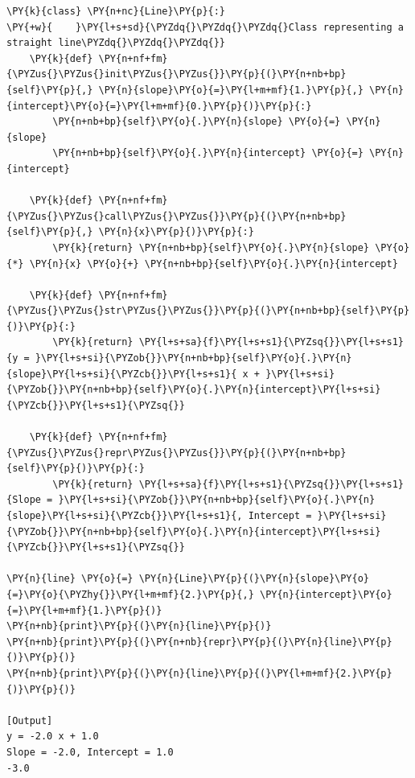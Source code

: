 \begin{Verbatim}[label=\makebox{\url{https://github.com/lucabaldini/cmepda/tree/master/slides/latex/snippets/callable\_line.py}},commandchars=\\\{\}]
\PY{k}{class} \PY{n+nc}{Line}\PY{p}{:}
\PY{+w}{    }\PY{l+s+sd}{\PYZdq{}\PYZdq{}\PYZdq{}Class representing a straight line\PYZdq{}\PYZdq{}\PYZdq{}}
    \PY{k}{def} \PY{n+nf+fm}{\PYZus{}\PYZus{}init\PYZus{}\PYZus{}}\PY{p}{(}\PY{n+nb+bp}{self}\PY{p}{,} \PY{n}{slope}\PY{o}{=}\PY{l+m+mf}{1.}\PY{p}{,} \PY{n}{intercept}\PY{o}{=}\PY{l+m+mf}{0.}\PY{p}{)}\PY{p}{:}
        \PY{n+nb+bp}{self}\PY{o}{.}\PY{n}{slope} \PY{o}{=} \PY{n}{slope}
        \PY{n+nb+bp}{self}\PY{o}{.}\PY{n}{intercept} \PY{o}{=} \PY{n}{intercept}

    \PY{k}{def} \PY{n+nf+fm}{\PYZus{}\PYZus{}call\PYZus{}\PYZus{}}\PY{p}{(}\PY{n+nb+bp}{self}\PY{p}{,} \PY{n}{x}\PY{p}{)}\PY{p}{:}
        \PY{k}{return} \PY{n+nb+bp}{self}\PY{o}{.}\PY{n}{slope} \PY{o}{*} \PY{n}{x} \PY{o}{+} \PY{n+nb+bp}{self}\PY{o}{.}\PY{n}{intercept}

    \PY{k}{def} \PY{n+nf+fm}{\PYZus{}\PYZus{}str\PYZus{}\PYZus{}}\PY{p}{(}\PY{n+nb+bp}{self}\PY{p}{)}\PY{p}{:}
        \PY{k}{return} \PY{l+s+sa}{f}\PY{l+s+s1}{\PYZsq{}}\PY{l+s+s1}{y = }\PY{l+s+si}{\PYZob{}}\PY{n+nb+bp}{self}\PY{o}{.}\PY{n}{slope}\PY{l+s+si}{\PYZcb{}}\PY{l+s+s1}{ x + }\PY{l+s+si}{\PYZob{}}\PY{n+nb+bp}{self}\PY{o}{.}\PY{n}{intercept}\PY{l+s+si}{\PYZcb{}}\PY{l+s+s1}{\PYZsq{}}

    \PY{k}{def} \PY{n+nf+fm}{\PYZus{}\PYZus{}repr\PYZus{}\PYZus{}}\PY{p}{(}\PY{n+nb+bp}{self}\PY{p}{)}\PY{p}{:}
        \PY{k}{return} \PY{l+s+sa}{f}\PY{l+s+s1}{\PYZsq{}}\PY{l+s+s1}{Slope = }\PY{l+s+si}{\PYZob{}}\PY{n+nb+bp}{self}\PY{o}{.}\PY{n}{slope}\PY{l+s+si}{\PYZcb{}}\PY{l+s+s1}{, Intercept = }\PY{l+s+si}{\PYZob{}}\PY{n+nb+bp}{self}\PY{o}{.}\PY{n}{intercept}\PY{l+s+si}{\PYZcb{}}\PY{l+s+s1}{\PYZsq{}}

\PY{n}{line} \PY{o}{=} \PY{n}{Line}\PY{p}{(}\PY{n}{slope}\PY{o}{=}\PY{o}{\PYZhy{}}\PY{l+m+mf}{2.}\PY{p}{,} \PY{n}{intercept}\PY{o}{=}\PY{l+m+mf}{1.}\PY{p}{)}
\PY{n+nb}{print}\PY{p}{(}\PY{n}{line}\PY{p}{)}
\PY{n+nb}{print}\PY{p}{(}\PY{n+nb}{repr}\PY{p}{(}\PY{n}{line}\PY{p}{)}\PY{p}{)}
\PY{n+nb}{print}\PY{p}{(}\PY{n}{line}\PY{p}{(}\PY{l+m+mf}{2.}\PY{p}{)}\PY{p}{)}

[Output]
y = -2.0 x + 1.0
Slope = -2.0, Intercept = 1.0
-3.0
\end{Verbatim}